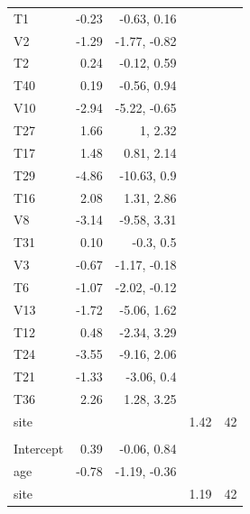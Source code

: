 \documentclass[
]{article}
\begin{document}
\begin{longtable}[t]{lrrrr}
\hspace{1em}T1 & -0.23 & -0.63, 0.16 &  & \\
\hspace{1em}V2 & -1.29 & -1.77, -0.82 &  & \\
\hspace{1em}T2 & 0.24 & -0.12, 0.59 &  & \\
\hspace{1em}T40 & 0.19 & -0.56, 0.94 &  & \\
\hspace{1em}V10 & -2.94 & -5.22, -0.65 &  & \\
\hspace{1em}T27 & 1.66 & 1, 2.32 &  & \\
\hspace{1em}T17 & 1.48 & 0.81, 2.14 &  & \\
\hspace{1em}T29 & -4.86 & -10.63, 0.9 &  & \\
\hspace{1em}T16 & 2.08 & 1.31, 2.86 &  & \\
\hspace{1em}V8 & -3.14 & -9.58, 3.31 &  & \\
\hspace{1em}T31 & 0.10 & -0.3, 0.5 &  & \\
\hspace{1em}V3 & -0.67 & -1.17, -0.18 &  & \\
\hspace{1em}T6 & -1.07 & -2.02, -0.12 &  & \\
\hspace{1em}V13 & -1.72 & -5.06, 1.62 &  & \\
\hspace{1em}T12 & 0.48 & -2.34, 3.29 &  & \\
\hspace{1em}T24 & -3.55 & -9.16, 2.06 &  & \\
\hspace{1em}T21 & -1.33 & -3.06, 0.4 &  & \\
\hspace{1em}T36 & 2.26 & 1.28, 3.25 &  & \\
\hspace{1em}site &  &  & 1.42 & 42\\
\addlinespace[0.3em]
\multicolumn{5}{l}{\textbf{Zero-inflation model}}\\
\hspace{1em}Intercept & 0.39 & -0.06, 0.84 &  & \\
\hspace{1em}age & -0.78 & -1.19, -0.36 &  & \\
\hspace{1em}site &  &  & 1.19 & 42\\
\bottomrule
\end{longtable}
\end{document}
